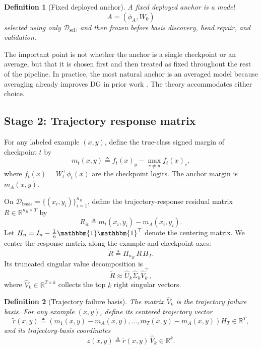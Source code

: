 \documentclass{article}
\newtheorem{definition}{Definition}
\newcommand{\RR}{\mathbb{R}}
\newcommand{\cD}{\mathcal{D}}
\newcommand{\1}{\mathbbm{1}}
\newcommand{\paren}[1]{\left( #1 \right)}
\begin{document}
\begin{definition}[Fixed deployed anchor]
A fixed deployed anchor is a model
\[
    A = (\phi_A, W_0)
\]
selected using only \(\cD_{\mathrm{sel}}\), and then frozen before basis discovery, head repair, and validation.
\end{definition}

The important point is not whether the anchor is a single checkpoint or an average, but that it is chosen first and then treated as fixed throughout the rest of the pipeline. In practice, the most natural anchor is an averaged model because averaging already improves DG in prior work \citep{cha2021swad,wortsman2022soups,rame2022diwa}. The theory accommodates either choice.

\subsection{Stage 2: Trajectory response matrix}

For any labeled example \((x,y)\), define the true-class signed margin of checkpoint \(t\) by
\begin{equation}
    m_t(x,y)
    \triangleq
    f_t(x)_y - \max_{c\neq y} f_t(x)_c,
    \label{eq:margin}
\end{equation}
where \(f_t(x)=W_t^\top \phi_t(x)\) are the checkpoint logits. The anchor margin is \(m_A(x,y)\).

On \(\cD_{\mathrm{basis}} = \{(x_i,y_i)\}_{i=1}^{n_B}\), define the trajectory-response residual matrix \(R\in\RR^{n_B\times T}\) by
\begin{equation}
    R_{it}
    \triangleq
    m_t(x_i,y_i) - m_A(x_i,y_i).
    \label{eq:trajectory_matrix}
\end{equation}
Let \(H_n = I_n - \frac{1}{n}\1\1^\top\) denote the centering matrix. We center the response matrix along the example and checkpoint axes:
\begin{equation}
    \widetilde R
    \triangleq
    H_{n_B} \, R \, H_T.
    \label{eq:centered_matrix}
\end{equation}
Its truncated singular value decomposition is
\begin{equation}
    \widetilde R \approx \widehat U_k \widehat \Sigma_k \widehat V_k^\top,
    \label{eq:svd}
\end{equation}
where \(\widehat V_k \in \RR^{T\times k}\) collects the top \(k\) right singular vectors.

\begin{definition}[Trajectory failure basis]
The matrix \(\widehat V_k\) is the trajectory failure basis. For any example \((x,y)\), define its centered trajectory vector
\begin{equation}
    \widetilde r(x,y)
    \triangleq
    \paren{m_1(x,y)-m_A(x,y), \dots, m_T(x,y)-m_A(x,y)} H_T
    \in \RR^{T},
    \label{eq:trajectory_vector}
\end{equation}
and its trajectory-basis coordinates
\begin{equation}
    z(x,y)
    \triangleq
    \widetilde r(x,y)\,\widehat V_k
    \in \RR^k.
    \label{eq:basis_score}
\end{equation}
\end{definition}
\end{document}
